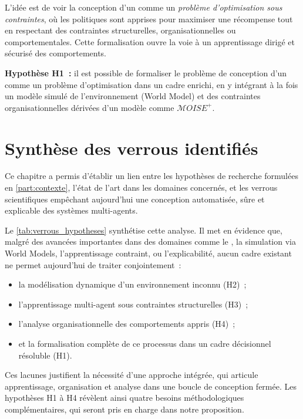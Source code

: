 \noindent
L'idée est de voir la conception d'un  comme un \textit{problème d'optimisation sous contraintes}, où les politiques sont apprises pour maximiser une récompense tout en respectant des contraintes structurelles, organisationnelles ou comportementales. Cette formalisation ouvre la voie à un apprentissage dirigé et sécurisé des comportements.

\medskip

\noindent
\textbf{Hypothèse H1~:} il est possible de formaliser le problème de conception d'un  comme un problème d'optimisation dans un cadre  enrichi, en y intégrant à la fois un modèle simulé de l'environnement (World Model) et des contraintes organisationnelles dérivées d'un modèle comme $\mathcal{M}OISE^+$.

\section*{Synthèse des verrous identifiés}

\noindent
Ce chapitre a permis d'établir un lien entre les hypothèses de recherche formulées en \autoref{part:contexte}, l'état de l'art dans les domaines concernés, et les verrous scientifiques empêchant aujourd'hui une conception automatisée, sûre et explicable des systèmes multi-agents.

\medskip

\noindent
Le \autoref{tab:verrous_hypotheses} synthétise cette analyse. Il met en évidence que, malgré des avancées importantes dans des domaines comme le , la simulation via World Models, l'apprentissage contraint, ou l'explicabilité, aucun cadre existant ne permet aujourd'hui de traiter conjointement~:
\begin{itemize}
  \item la modélisation dynamique d'un environnement inconnu (H2)~;
  \item l'apprentissage multi-agent sous contraintes structurelles (H3)~;
  \item l'analyse organisationnelle des comportements appris (H4)~;
  \item et la formalisation complète de ce processus dans un cadre décisionnel résoluble (H1).
\end{itemize}

\noindent
Ces lacunes justifient la nécessité d'une approche intégrée, qui articule apprentissage, organisation et analyse dans une boucle de conception fermée. Les hypothèses H1 à H4 révèlent ainsi quatre besoins méthodologiques complémentaires, qui seront pris en charge dans notre proposition.

